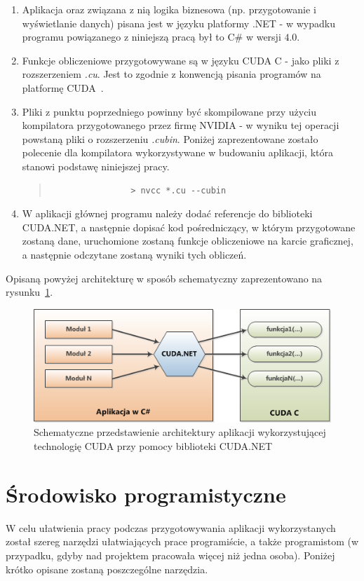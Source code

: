 \begin{enumerate}
	\item Aplikacja oraz związana z nią logika biznesowa (np. przygotowanie i wyświetlanie danych) pisana jest w języku platformy .NET - w wypadku programu powiązanego z niniejszą pracą był to C\# w wersji $4.0$.
	\item Funkcje obliczeniowe przygotowywane są w języku CUDA C - jako pliki z rozszerzeniem \emph{.cu}. Jest to zgodnie z konwencją pisania programów na platformę CUDA~\cite{Cuda:PGuide}.
	\item Pliki z punktu poprzedniego powinny być skompilowane przy użyciu kompilatora przygotowanego przez firmę NVIDIA - w wyniku tej operacji powstaną pliki o rozszerzeniu \emph{.cubin}. Poniżej zaprezentowane zostało polecenie dla kompilatora wykorzystywane w budowaniu aplikacji, która stanowi podstawę niniejszej pracy.
		\begin{quote}
			\begin{verbatim}
				> nvcc *.cu --cubin
			\end{verbatim}
		\end{quote}
	\item W aplikacji głównej programu należy dodać referencje do biblioteki CUDA.NET, a następnie dopisać kod pośredniczący, w którym przygotowane zostaną dane, uruchomione zostaną funkcje obliczeniowe na karcie graficznej, a następnie odczytane zostaną wyniki tych obliczeń.
\end{enumerate}

Opisaną powyżej architekturę w sposób schematyczny zaprezentowano na rysunku~\ref{rys:arch_cuda_net}.

\begin{figure}[h]
\centering
\includegraphics{figures/04/arch_cuda_net.png}
\caption{Schematyczne przedstawienie architektury aplikacji wykorzystującej technologię CUDA przy pomocy biblioteki CUDA.NET}\label{rys:arch_cuda_net}
\end{figure}

\section{Środowisko programistyczne}
W celu ułatwienia pracy podczas przygotowywania aplikacji wykorzystanych został szereg narzędzi ułatwiających prace programiście, a także programistom (w przypadku, gdyby nad projektem pracowała więcej niż jedna osoba). Poniżej krótko opisane zostaną poszczególne narzędzia.

